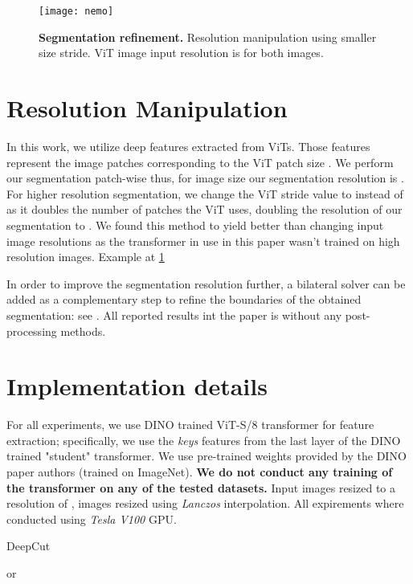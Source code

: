 \documentclass[10pt,twocolumn,letterpaper]{article}
\begin{document}
\begin{figure}[t]
\texttt{[image: nemo]}
\caption{
\textbf{Segmentation refinement.} Resolution manipulation using smaller size stride. ViT image input resolution is  for both images.
}
\label{fig:nemo}
 \end{figure}
 
\section{Resolution Manipulation}\label{res_man}
In this work, we utilize deep features extracted from ViTs. Those features represent the image patches corresponding to the ViT patch size .
We perform our segmentation patch-wise thus, for image size  our segmentation resolution is . For higher resolution segmentation, we change the ViT stride value to  instead of  as it doubles the number of patches the ViT uses, doubling the resolution of our segmentation to 
.
We found this method to yield better than changing input image resolutions as the transformer in use in this paper wasn't trained on high resolution images.
Example at \cref{fig:nemo}

In order to improve the segmentation resolution further, a bilateral solver\cite{barron2016fast} can be added as a complementary step to refine the boundaries of the obtained segmentation: see . All reported results int the paper is without any post-processing methods.

\section{Implementation details}
\label{sec:intro}
For all experiments, we use DINO \cite{caron2021emerging} trained ViT-S/8 transformer for feature extraction; specifically, we use the \emph{keys} features from the last layer of the DINO trained "student" transformer.  We use pre-trained weights provided by the DINO paper authors (trained on ImageNet\cite{ILSVRC15}).
 \textbf{We do not conduct any training of the transformer on any of the tested datasets.} Input images resized to a resolution of , images resized using \emph{Lanczos} interpolation. All expirements where conducted using \emph{Tesla V100} GPU.

\begin{algorithm}
\caption{DeepCut}\label{alg:cap}
\begin{algorithmic}[1]
\State 
\State  {}
\State 
{} 
    \State  {}
    \State 
    \State  {}
    \State 
    \State  or 
\EndFor
\State 
\end{algorithmic}
\end{algorithm}
\end{document}
